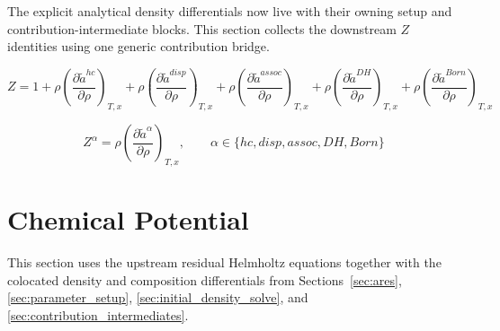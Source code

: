 \documentclass[12pt, letterpaper]{article}
\begin{document}
The explicit analytical density differentials now live with their owning setup and contribution-intermediate blocks. This section collects the downstream \(Z\) identities using one generic contribution bridge.

\begin{equation}
    Z = 1
    + \rho\left(\frac{\partial\tilde{a}^{hc}}{\partial\rho}\right)_{T,x}
    + \rho\left(\frac{\partial\tilde{a}^{disp}}{\partial\rho}\right)_{T,x}
    + \rho\left(\frac{\partial\tilde{a}^{assoc}}{\partial\rho}\right)_{T,x}
    + \rho\left(\frac{\partial\tilde{a}^{DH}}{\partial\rho}\right)_{T,x}
    + \rho\left(\frac{\partial\tilde{a}^{Born}}{\partial\rho}\right)_{T,x}
    \label{eq:z_total}
\end{equation}


\begin{equation}
    Z^{\alpha}
    =
    \rho\left(\frac{\partial\tilde{a}^{\alpha}}{\partial\rho}\right)_{T,x}
    ,
    \qquad
    \alpha\in\{hc,disp,assoc,DH,Born\}
    \label{eq:z_alpha}
\end{equation}

\section{Chemical Potential}
\label{sec:chemical_potential}

This section uses the upstream residual Helmholtz equations together with the colocated density and composition differentials from Sections~\ref{sec:ares}, \ref{sec:parameter_setup}, \ref{sec:initial_density_solve}, and \ref{sec:contribution_intermediates}.

\end{document}
